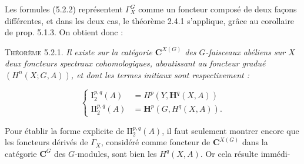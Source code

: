Les formules (5.2.2) représentent $\Gamma_X^G$ comme un foncteur composé de
deux façons différentes, et dans les deux cas, le théorème 2.4.1 s'applique,
grâce au corollaire de prop. 5.1.3. On obtient donc :

\textsc{Théorème 5.2.1.} \textit{Il existe sur la catégorie
${\mathbf C}^{X(G)}$ des $G$-faisceaux abéliens sur $X$ deux foncteurs spectraux
cohomologiques, aboutissant au foncteur gradué $(H^n(X;G,A))$, et dont les
termes initiaux sont respectivement :}

\[
\tag{5.2.5}
\left\{
\begin{aligned}
\mathrm I_2^{p,q}(A)&=H^p(Y,\mathbf H^q(X,A))\\
\mathrm {II}_2^{p,q}(A)&=\mathbf H^p(G,H^q(X,A)).
\end{aligned}
\right.
\]

Pour établir la forme explicite de $\mathrm {II}_2^{p,q}(A)$, il faut
seulement montrer encore que les foncteurs dérivés de $\Gamma_X$, considéré
comme foncteur de ${\mathbf C}^{X(G)}$ dans la catégorie ${\mathbf C}^G$ des $G$-modules, sont
bien les $H^q(X,A)$. Or cela résulte immédi-

